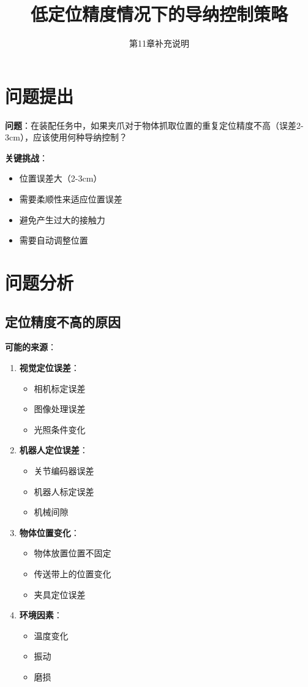 \documentclass[12pt,a4paper]{article}
\title{低定位精度情况下的导纳控制策略}
\author{第11章补充说明}
\date{}
\begin{document}
\maketitle

\section{问题提出}

\textbf{问题}：在装配任务中，如果夹爪对于物体抓取位置的重复定位精度不高（误差2-3cm），应该使用何种导纳控制？

\textbf{关键挑战}：
\begin{itemize}
\item 位置误差大（2-3cm）
\item 需要柔顺性来适应位置误差
\item 避免产生过大的接触力
\item 需要自动调整位置
\end{itemize}

\section{问题分析}

\subsection{定位精度不高的原因}

\textbf{可能的来源}：
\begin{enumerate}
\item \textbf{视觉定位误差}：
\begin{itemize}
\item 相机标定误差
\item 图像处理误差
\item 光照条件变化
\end{itemize}

\item \textbf{机器人定位误差}：
\begin{itemize}
\item 关节编码器误差
\item 机器人标定误差
\item 机械间隙
\end{itemize}

\item \textbf{物体位置变化}：
\begin{itemize}
\item 物体放置位置不固定
\item 传送带上的位置变化
\item 夹具定位误差
\end{itemize}

\item \textbf{环境因素}：
\begin{itemize}
\item 温度变化
\item 振动
\item 磨损
\end{itemize}
\end{enumerate}
\end{document}
